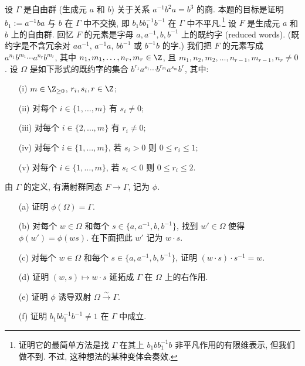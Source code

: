 \begin{exercise}[$b_1$ 与 $b$ 不交换]
\label{ex:I.5.5.8}
设 $\Gamma$ 是自由群 (生成元 $a$ 和 $b$) 关于关系 $a^{-1}b^2a = b^3$ 的商. 本题的目标是证明 $b_1 := a^{-1}ba$ 与 $b$ 在 $\Gamma$ 中不交换, 即 $b_1bb_1^{-1}b^{-1}$ 在 $\Gamma$ 中不平凡.\footnote{证明它的最简单方法是找 $\Gamma$ 在其上 $b_1bb_1^{-1}b$ 非平凡作用的有限维表示, 但我们做不到. 不过, 这种想法的某种变体会奏效.}
设 $F$ 是生成元 $a$ 和 $b$ 上的自由群. 回忆 $F$ 的元素是字母 $a, a^{-1}, b, b^{-1}$ 上的既约字 (reduced words). (既约字是不含冗余对 $aa^{-1}$, $a^{-1}a$, $bb^{-1}$ 或 $b^{-1}b$ 的字.) 我们把 $F$ 的元素写成 $a^{n_1}b^{m_1}\cdots a^{n_r}b^{m_r}$, 其中 $n_1, m_1, \ldots, n_r, m_r \in \Z$, 且 $m_1, n_2, m_2, \ldots, n_{r-1}, m_{r-1}, n_r \neq 0$.
设 $\Omega$ 是如下形式的既约字的集合 $b^{r_1}a^{s_1}\cdots b^{r_m}a^{s_m}b^r$, 其中:
\begin{enumerate}
\item[(i)] $m \in \Z_{\geq 0}$, $r_i, s_i, r \in \Z$;
\item[(ii)] 对每个 $i \in \{1, \ldots, m\}$ 有 $s_i \neq 0$;
\item[(iii)] 对每个 $i \in \{2, \ldots, m\}$ 有 $r_i \neq 0$;
\item[(iv)] 对每个 $i \in \{1, \ldots, m\}$, 若 $s_i > 0$ 则 $0 \leq r_i \leq 1$;
\item[(v)] 对每个 $i \in \{1, \ldots, m\}$, 若 $s_i < 0$ 则 $0 \leq r_i \leq 2$.
\end{enumerate}
由 $\Gamma$ 的定义, 有满射群同态 $F \to \Gamma$, 记为 $\phi$.
\begin{enumerate}
\item[(a)] 证明 $\phi(\Omega) = \Gamma$.
\item[(b)] 对每个 $w \in \Omega$ 和每个 $s \in \{a, a^{-1}, b, b^{-1}\}$, 找到 $w' \in \Omega$ 使得 $\phi(w') = \phi(ws)$. 在下面把此 $w'$ 记为 $w \cdot s$.
\item[(c)] 对每个 $w \in \Omega$ 和每个 $s \in \{a, a^{-1}, b, b^{-1}\}$, 证明 $(w \cdot s) \cdot s^{-1} = w$.
\item[(d)] 证明 $(w, s) \longmapsto w \cdot s$ 延拓成 $\Gamma$ 在 $\Omega$ 上的右作用.
\item[(e)] 证明 $\phi$ 诱导双射 $\Omega \xrightarrow{\sim} \Gamma$.
\item[(f)] 证明 $b_1bb_1^{-1}b^{-1} \neq 1$ 在 $\Gamma$ 中成立.
\end{enumerate}
\end{exercise}

